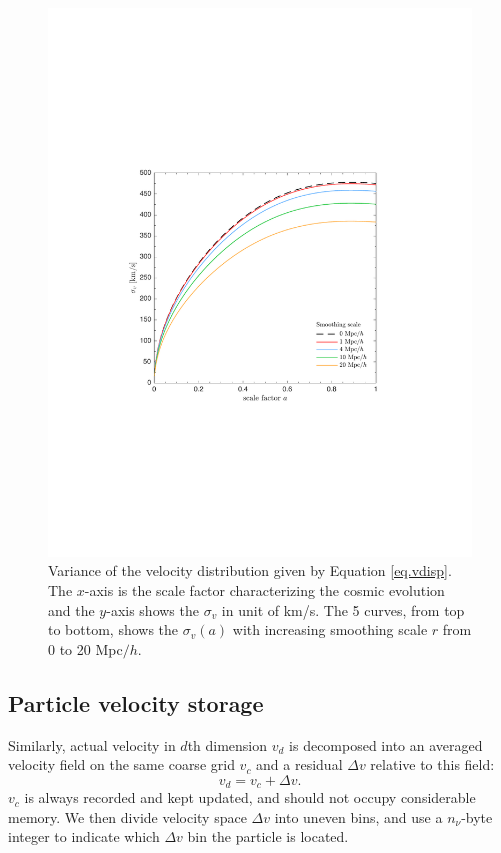 \documentclass[10pt,twocolumn,preprint]{emulateapj}
\begin{document}
\begin{figure}
\centering
  \includegraphics[width=1\linewidth]{f1}
 \caption{Variance of the velocity distribution given by Equation \ref{eq.vdisp}. The $x$-axis is the scale factor characterizing the cosmic evolution and the $y$-axis shows the $\sigma_v$ in unit of km/s. The 5 curves, from top to bottom, shows the $\sigma_v(a)$ with increasing smoothing scale $r$ from 0 to 20 Mpc$/h$.}
\label{fig.vdisp}
\end{figure}

\subsection{Particle velocity storage}\label{ss.velocity}
Similarly, actual velocity in $d$th dimension $v_d$ is decomposed into an averaged velocity field on the same coarse grid $v_c$ and a residual $\Delta v$ relative to this field:
\begin{equation}\label{eq.deltav}
	v_d=v_c+\Delta v.
\end{equation}
$v_c$ is always recorded and kept updated, and should not occupy considerable memory. We then divide velocity space $\Delta v$ into uneven bins, and use a $n_\nu$-byte integer to indicate which $\Delta v$ bin the particle is located.
\end{document}
